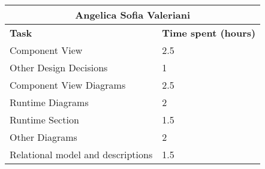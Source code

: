 \begin{table}[ht]
  \center
  \begin{tabular}{l|l}
    \multicolumn{2}{c}{\textbf{Angelica Sofia Valeriani}} \\
    \hline
    \textbf{Task} & \textbf{Time spent (hours)}\\
    \hline
    Component View & 2.5 \\
    Other Design Decisions & 1 \\
    Component View Diagrams & 2.5 \\
    Runtime Diagrams & 2 \\
    Runtime Section & 1.5 \\
    Other Diagrams & 2 \\
    Relational model and descriptions & 1.5 \\
  \end{tabular}
\end{table}